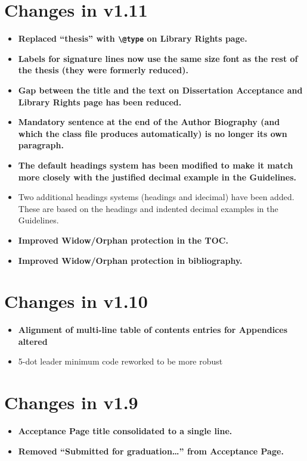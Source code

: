 \section{Changes in v1.11}
\begin{itemize}
\item{\bfseries Replaced ``thesis'' with \verb=\@type= on Library Rights page.}
\item{\textbf{Labels for signature lines now use the same size font as the rest of the thesis (they were formerly reduced).}}
\item{\textbf{Gap between the title and the text on Dissertation Acceptance and Library Rights page has been reduced.}}
\item{\textbf{Mandatory sentence at the end of the Author Biography (and which the class file produces automatically) is no longer its own paragraph.}}
\item{\textbf{The default headings system has been modified to make it match more closely with the justified decimal example in the Guidelines.}}
\item{Two additional headings systems (headings and idecimal) have been added.  These are based on the headings and indented decimal examples in the Guidelines.}
\item{\bfseries Improved Widow/Orphan protection in the TOC.}
\item{\bfseries Improved Widow/Orphan protection in bibliography.}
\end{itemize}

\section{Changes in v1.10}
\begin{itemize}
\item{\textbf{Alignment of multi-line table of contents entries for Appendices altered}}
\item{5-dot leader minimum code reworked to be more robust}
\end{itemize}

\section{Changes in v1.9}
\begin{itemize}
\item{\textbf{Acceptance Page title consolidated to a single line.}}
\item{\textbf{Removed ``Submitted for graduation\ldots'' from Acceptance Page.}}
\end{itemize}

